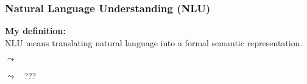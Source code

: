 \begin{frame}
    \frametitle{Natural Language Understanding (NLU)}
    \textbf{My definition:}\\
    NLU means translating natural language into a formal semantic representation.

    \vspace{3em}
     $\leadsto\;\;$ 

    \vspace{1.5em}
     $\leadsto\;\;$ ???


\end{frame}
